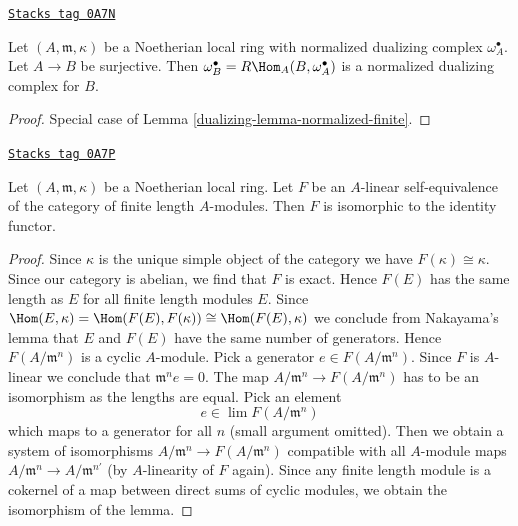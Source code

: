 \begin{lemma}
\label{dualizing-lemma-normalized-quotient}
\href{https://stacks.math.columbia.edu/tag/0A7N}{\texttt{Stacks tag 0A7N}}

Let $(A, \mathfrak m, \kappa)$ be a Noetherian local
ring with normalized dualizing complex $\omega_A^\bullet$.
Let $A \to B$ be surjective. Then
$\omega_B^\bullet = R\Hom_A(B, \omega_A^\bullet)$ is a
normalized dualizing complex for $B$.
\end{lemma}

\begin{proof}

Special case of Lemma \ref{dualizing-lemma-normalized-finite}.
\end{proof}

\begin{lemma}
\label{dualizing-lemma-equivalence-finite-length}
\href{https://stacks.math.columbia.edu/tag/0A7P}{\texttt{Stacks tag 0A7P}}

Let $(A, \mathfrak m, \kappa)$ be a Noetherian local
ring. Let $F$ be an $A$-linear self-equivalence of the category of
finite length $A$-modules. Then $F$ is isomorphic to the identity functor.
\end{lemma}

\begin{proof}
Since $\kappa$ is the unique simple object of the category we have
$F(\kappa) \cong \kappa$. Since our category is abelian, we find that
$F$ is exact. Hence $F(E)$ has the same length as $E$ for all finite
length modules $E$.
Since $\Hom(E, \kappa) = \Hom(F(E), F(\kappa)) \cong \Hom(F(E), \kappa)$
we conclude from Nakayama's lemma that $E$ and $F(E)$ have the same
number of generators. Hence $F(A/\mathfrak m^n)$ is a cyclic $A$-module.
Pick a generator $e \in F(A/\mathfrak m^n)$.
Since $F$ is $A$-linear we conclude that $\mathfrak m^n e = 0$.
The map $A/\mathfrak m^n \to F(A/\mathfrak m^n)$ has to be
an isomorphism as the lengths are equal. Pick an element
$$
e \in \lim F(A/\mathfrak m^n)
$$
which maps to a generator for all $n$ (small argument omitted).
Then we obtain a system of isomorphisms
$A/\mathfrak m^n \to F(A/\mathfrak m^n)$ compatible with all
$A$-module maps $A/\mathfrak m^n \to A/\mathfrak m^{n'}$ (by $A$-linearity
of $F$ again). Since any finite length module is a cokernel
of a map between direct sums of cyclic modules, we obtain the isomorphism
of the lemma.
\end{proof}

